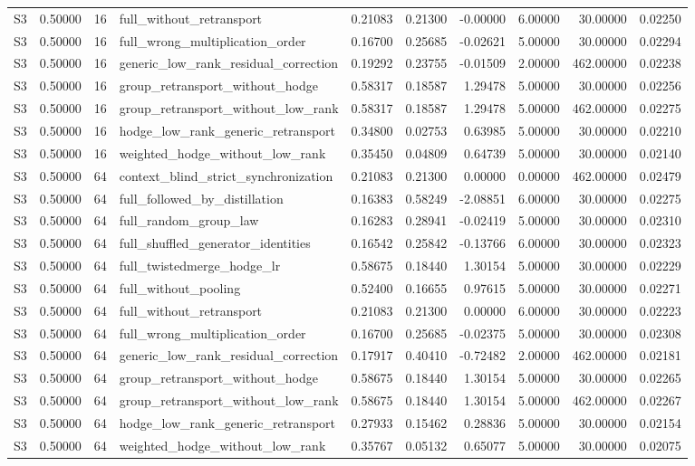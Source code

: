 \begin{tabular}{lrrlrrrrrr}
S3 & 0.50000 & 16 & full_without_retransport & 0.21083 & 0.21300 & -0.00000 & 6.00000 & 30.00000 & 0.02250 \\
S3 & 0.50000 & 16 & full_wrong_multiplication_order & 0.16700 & 0.25685 & -0.02621 & 5.00000 & 30.00000 & 0.02294 \\
S3 & 0.50000 & 16 & generic_low_rank_residual_correction & 0.19292 & 0.23755 & -0.01509 & 2.00000 & 462.00000 & 0.02238 \\
S3 & 0.50000 & 16 & group_retransport_without_hodge & 0.58317 & 0.18587 & 1.29478 & 5.00000 & 30.00000 & 0.02256 \\
S3 & 0.50000 & 16 & group_retransport_without_low_rank & 0.58317 & 0.18587 & 1.29478 & 5.00000 & 462.00000 & 0.02275 \\
S3 & 0.50000 & 16 & hodge_low_rank_generic_retransport & 0.34800 & 0.02753 & 0.63985 & 5.00000 & 30.00000 & 0.02210 \\
S3 & 0.50000 & 16 & weighted_hodge_without_low_rank & 0.35450 & 0.04809 & 0.64739 & 5.00000 & 30.00000 & 0.02140 \\
S3 & 0.50000 & 64 & context_blind_strict_synchronization & 0.21083 & 0.21300 & 0.00000 & 0.00000 & 462.00000 & 0.02479 \\
S3 & 0.50000 & 64 & full_followed_by_distillation & 0.16383 & 0.58249 & -2.08851 & 6.00000 & 30.00000 & 0.02275 \\
S3 & 0.50000 & 64 & full_random_group_law & 0.16283 & 0.28941 & -0.02419 & 5.00000 & 30.00000 & 0.02310 \\
S3 & 0.50000 & 64 & full_shuffled_generator_identities & 0.16542 & 0.25842 & -0.13766 & 6.00000 & 30.00000 & 0.02323 \\
S3 & 0.50000 & 64 & full_twistedmerge_hodge_lr & 0.58675 & 0.18440 & 1.30154 & 5.00000 & 30.00000 & 0.02229 \\
S3 & 0.50000 & 64 & full_without_pooling & 0.52400 & 0.16655 & 0.97615 & 5.00000 & 30.00000 & 0.02271 \\
S3 & 0.50000 & 64 & full_without_retransport & 0.21083 & 0.21300 & 0.00000 & 6.00000 & 30.00000 & 0.02223 \\
S3 & 0.50000 & 64 & full_wrong_multiplication_order & 0.16700 & 0.25685 & -0.02375 & 5.00000 & 30.00000 & 0.02308 \\
S3 & 0.50000 & 64 & generic_low_rank_residual_correction & 0.17917 & 0.40410 & -0.72482 & 2.00000 & 462.00000 & 0.02181 \\
S3 & 0.50000 & 64 & group_retransport_without_hodge & 0.58675 & 0.18440 & 1.30154 & 5.00000 & 30.00000 & 0.02265 \\
S3 & 0.50000 & 64 & group_retransport_without_low_rank & 0.58675 & 0.18440 & 1.30154 & 5.00000 & 462.00000 & 0.02267 \\
S3 & 0.50000 & 64 & hodge_low_rank_generic_retransport & 0.27933 & 0.15462 & 0.28836 & 5.00000 & 30.00000 & 0.02154 \\
S3 & 0.50000 & 64 & weighted_hodge_without_low_rank & 0.35767 & 0.05132 & 0.65077 & 5.00000 & 30.00000 & 0.02075 \\
\bottomrule
\end{tabular}
